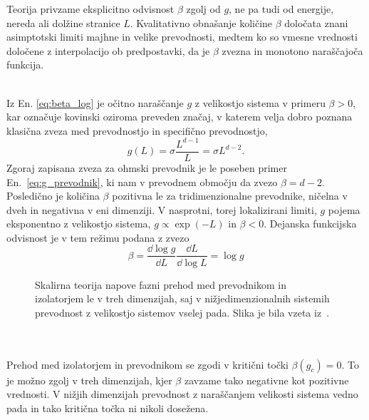 \documentclass[10pt,a4paper]{article}
\begin{document}
Teorija privzame eksplicitno odvisnost $\beta$ zgolj od $g$, ne pa tudi od energije, nereda ali dolžine stranice $L$. Kvalitativno obnašanje količine $\beta$ določata znani asimptotski limiti majhne in velike prevodnosti, medtem ko so vmesne vrednosti določene z interpolacijo ob predpostavki, da je $\beta$ zvezna in monotono naraščajoča funkcija. \\\\
\begin{minipage}[t]{0.54\textwidth}
Iz En. \eqref{eq:beta_log} je očitno naraščanje $g$ z velikostjo sistema v primeru $\beta>0$, kar označuje kovinski oziroma preveden značaj, v katerem velja dobro poznana klasična zveza med prevodnostjo in specifično prevodnostjo,
\begin{equation}\label{eq:g_prevodnik}
g(L)=\sigma\frac{L^{d-1}}{L}=\sigma L^{d-2}.
\end{equation}
Zgoraj zapisana zveza za ohmski prevodnik je le poseben primer En.~\eqref{eq:g_prevodnik}, ki nam v prevodnem območju da zvezo $\beta=d-2$. Posledično je količina $\beta$ pozitivna le za tridimenzionalne prevodnike, ničelna v dveh in negativna v eni dimenziji. V nasprotni, torej lokalizirani limiti, $g$ pojema eksponentno z velikostjo sistema, $g\propto \exp(-L)$ in $\beta<0$. Dejanska funkcijska odvisnost je v tem režimu podana z zvezo 
\begin{equation}
\beta=\frac{\dd \log g}{\dd L}\frac{\dd L}{\dd \log L}=\log g
\end{equation}
\end{minipage}\hfill
\begin{minipage}[t]{0.43\textwidth}
\begin{figure}[H]
\caption{Skalirna teorija napove fazni prehod med prevodnikom in izolatorjem le v treh dimenzijah, saj v nižjedimenzionalnih sistemih prevodnost z velikostjo sistemov vselej pada. Slika je bila vzeta iz~\cite{lagendijk2009fifty}.}
\label{fig:scalingtheory} 
\end{figure}
\end{minipage}\\\\
Prehod med izolatorjem in prevodnikom se zgodi v kritični točki $\beta(g_c)=0$. To je možno zgolj v treh dimenzijah, kjer $\beta$ zavzame tako negativne kot pozitivne vrednosti. V nižjih dimenzijah prevodnost z naraščanjem velikosti sistema vedno pada in tako kritična točka ni nikoli dosežena. 
\end{document}
